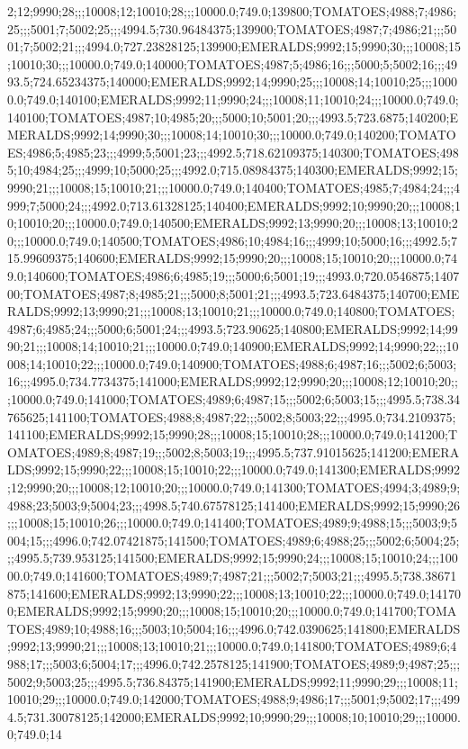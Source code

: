 2;12;9990;28;;;10008;12;10010;28;;;10000.0;749.0;139800;TOMATOES;4988;7;4986;25;;;5001;7;5002;25;;;4994.5;730.96484375;139900;TOMATOES;4987;7;4986;21;;;5001;7;5002;21;;;4994.0;727.23828125;139900;EMERALDS;9992;15;9990;30;;;10008;15;10010;30;;;10000.0;749.0;140000;TOMATOES;4987;5;4986;16;;;5000;5;5002;16;;;4993.5;724.65234375;140000;EMERALDS;9992;14;9990;25;;;10008;14;10010;25;;;10000.0;749.0;140100;EMERALDS;9992;11;9990;24;;;10008;11;10010;24;;;10000.0;749.0;140100;TOMATOES;4987;10;4985;20;;;5000;10;5001;20;;;4993.5;723.6875;140200;EMERALDS;9992;14;9990;30;;;10008;14;10010;30;;;10000.0;749.0;140200;TOMATOES;4986;5;4985;23;;;4999;5;5001;23;;;4992.5;718.62109375;140300;TOMATOES;4985;10;4984;25;;;4999;10;5000;25;;;4992.0;715.08984375;140300;EMERALDS;9992;15;9990;21;;;10008;15;10010;21;;;10000.0;749.0;140400;TOMATOES;4985;7;4984;24;;;4999;7;5000;24;;;4992.0;713.61328125;140400;EMERALDS;9992;10;9990;20;;;10008;10;10010;20;;;10000.0;749.0;140500;EMERALDS;9992;13;9990;20;;;10008;13;10010;20;;;10000.0;749.0;140500;TOMATOES;4986;10;4984;16;;;4999;10;5000;16;;;4992.5;715.99609375;140600;EMERALDS;9992;15;9990;20;;;10008;15;10010;20;;;10000.0;749.0;140600;TOMATOES;4986;6;4985;19;;;5000;6;5001;19;;;4993.0;720.0546875;140700;TOMATOES;4987;8;4985;21;;;5000;8;5001;21;;;4993.5;723.6484375;140700;EMERALDS;9992;13;9990;21;;;10008;13;10010;21;;;10000.0;749.0;140800;TOMATOES;4987;6;4985;24;;;5000;6;5001;24;;;4993.5;723.90625;140800;EMERALDS;9992;14;9990;21;;;10008;14;10010;21;;;10000.0;749.0;140900;EMERALDS;9992;14;9990;22;;;10008;14;10010;22;;;10000.0;749.0;140900;TOMATOES;4988;6;4987;16;;;5002;6;5003;16;;;4995.0;734.7734375;141000;EMERALDS;9992;12;9990;20;;;10008;12;10010;20;;;10000.0;749.0;141000;TOMATOES;4989;6;4987;15;;;5002;6;5003;15;;;4995.5;738.34765625;141100;TOMATOES;4988;8;4987;22;;;5002;8;5003;22;;;4995.0;734.2109375;141100;EMERALDS;9992;15;9990;28;;;10008;15;10010;28;;;10000.0;749.0;141200;TOMATOES;4989;8;4987;19;;;5002;8;5003;19;;;4995.5;737.91015625;141200;EMERALDS;9992;15;9990;22;;;10008;15;10010;22;;;10000.0;749.0;141300;EMERALDS;9992;12;9990;20;;;10008;12;10010;20;;;10000.0;749.0;141300;TOMATOES;4994;3;4989;9;4988;23;5003;9;5004;23;;;4998.5;740.67578125;141400;EMERALDS;9992;15;9990;26;;;10008;15;10010;26;;;10000.0;749.0;141400;TOMATOES;4989;9;4988;15;;;5003;9;5004;15;;;4996.0;742.07421875;141500;TOMATOES;4989;6;4988;25;;;5002;6;5004;25;;;4995.5;739.953125;141500;EMERALDS;9992;15;9990;24;;;10008;15;10010;24;;;10000.0;749.0;141600;TOMATOES;4989;7;4987;21;;;5002;7;5003;21;;;4995.5;738.38671875;141600;EMERALDS;9992;13;9990;22;;;10008;13;10010;22;;;10000.0;749.0;141700;EMERALDS;9992;15;9990;20;;;10008;15;10010;20;;;10000.0;749.0;141700;TOMATOES;4989;10;4988;16;;;5003;10;5004;16;;;4996.0;742.0390625;141800;EMERALDS;9992;13;9990;21;;;10008;13;10010;21;;;10000.0;749.0;141800;TOMATOES;4989;6;4988;17;;;5003;6;5004;17;;;4996.0;742.2578125;141900;TOMATOES;4989;9;4987;25;;;5002;9;5003;25;;;4995.5;736.84375;141900;EMERALDS;9992;11;9990;29;;;10008;11;10010;29;;;10000.0;749.0;142000;TOMATOES;4988;9;4986;17;;;5001;9;5002;17;;;4994.5;731.30078125;142000;EMERALDS;9992;10;9990;29;;;10008;10;10010;29;;;10000.0;749.0;14
